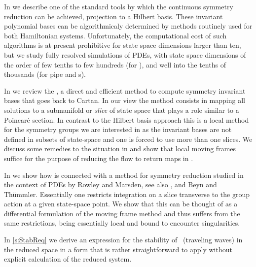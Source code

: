 In  we describe one of the standard tools
by which the continuous symmetry reduction can be achieved,  projection 
to a Hilbert basis. These invariant polynomial bases can be algorithmicaly determined
by methods routinely used for both Hamiltonian  systems. 
Unfortunately, the computational cost of such algorithms is at present prohibitive 
for state space dimensions larger than ten,
but we study fully resolved simulations of PDEs, with state space dimensions 
of the order of few tenths to few hundreds (for \KSe), and
well into the tenths of thousands (for pipe and \pCf s). 

In  we review the \emph{\mframes}, a direct and efficient method 
to compute symmetry invariant bases that goes back to Cartan. 
In our view the method consists in mapping all solutions to a submanifold 
or \emph{slice} of state space that plays a role similar to a Poincar\'e section. 
In contrast to the Hilbert basis approach this is a local method for the symmetry groups 
we are interested in as the invariant bases are not defined in subsets 
of state-space and one is forced to use more than one slices. 
We discuss some remedies to the situation 
in  
and show that local moving frames 
suffice for the purpose of reducing the flow to return maps in .

In  we show how {\mframes}
is connected with a method for symmetry reduction studied in
the context of PDEs by Rowley and Marsden, see also , 
and Beyn and Th\"ummler. 
Essentially one restricts integration on a slice transverse to 
the group action at a given state-space point. We show that this can be thought of as a differential formulation 
of the moving frame method and thus suffers from the same restrictions, being essentially local 
and bound to encounter singularities.  

In \ref{s:StabReq} we derive an expression for the stability of \reqva\ (traveling waves) in the reduced space
in a form that is rather straightforward to apply without explicit calculation of
the reduced system.






